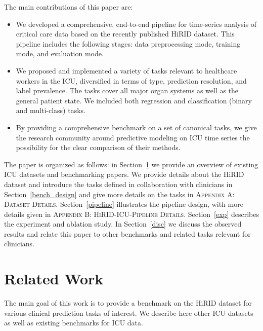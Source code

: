 \documentclass{article}
\begin{document}
The main contributions of this paper are:
\begin{itemize}
    \item We developed a comprehensive, end-to-end pipeline for time-series analysis of critical care data based on the recently published HiRID dataset. This pipeline includes the following stages: data preprocessing mode, training mode, and evaluation mode. 
    \item We proposed and implemented a variety of tasks relevant to healthcare workers in the ICU, diversified in terms of type, prediction resolution, and label prevalence. The tasks cover all major organ systems as well as the general patient state. We included both regression and classification (binary and multi-class) tasks. 
    \item By providing a comprehensive benchmark on a set of canonical tasks, we give the research community around predictive modeling on  ICU time series the possibility for the clear comparison of their methods.
\end{itemize}
The paper is organized as follows: in Section~\ref{rel_work} we provide an overview of existing ICU datasets and benchmarking papers. We provide details about the HiRID dataset and introduce the tasks defined in collaboration with clinicians in Section~\ref{bench_design} and give more details on the tasks in \textsc{Appendix A: Dataset Details}. Section~\ref{pipeline} illustrates the pipeline design, with more details given in \textsc{Appendix B: HiRID-ICU-Pipeline Details}. Section~\ref{exp} describes the experiment and ablation study. In Section~\ref{disc} we discuss the observed results and relate this paper to other benchmarks and related tasks relevant for clinicians. 

\section{Related Work}\label{rel_work}
The main goal of this work is to provide a benchmark on the HiRID dataset for various clinical prediction tasks of interest. We describe here other ICU datasets as well as existing benchmarks for ICU data.
\end{document}
